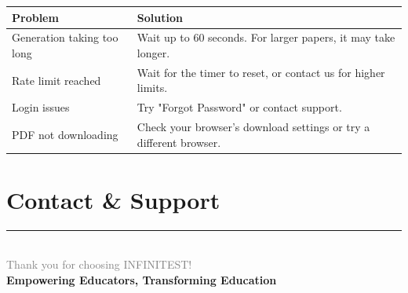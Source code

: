 \documentclass[11pt,a4paper]{article}
\begin{document}
\begin{center}
\renewcommand{\arraystretch}{1.5}
\begin{tabularx}{\textwidth}{|l|X|}
\hline
\textbf{Problem} & \textbf{Solution} \\
\hline
Generation taking too long & Wait up to 60 seconds. For larger papers, it may take longer. \\
\hline
Rate limit reached & Wait for the timer to reset, or contact us for higher limits. \\
\hline
Login issues & Try "Forgot Password" or contact support. \\
\hline
PDF not downloading & Check your browser's download settings or try a different browser. \\
\hline
\end{tabularx}
\end{center}

\section{Contact \& Support}

\begin{center}
\end{center}

\vspace{1cm}

\begin{center}
\textcolor{graytext}{\rule{0.5\textwidth}{0.5pt}}\\[0.5cm]
\textcolor{graytext}{\small Thank you for choosing INFINITEST!}\\
\textcolor{primary}{\textbf{Empowering Educators, Transforming Education}}
\end{center}
\end{document}
